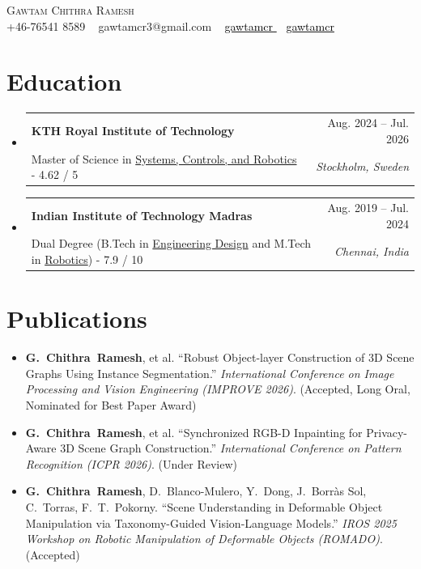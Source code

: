 \documentclass[letterpaper, 11pt]{article}
\makeatletter
\newcommand{\resumeSubheading}[4]{
\vspace{-1pt}
\item
\begin{tabular*}{1.0\textwidth}[t]{l@{\extracolsep{\fill}}r}
	\textbf{#1}       & {\small #2} \\
	{\small#3} & \textit{\small #4} \\
\end{tabular*}
\vspace{-10pt}
}
\newcommand{\resumeSubHeadingListStart}{\begin{itemize}[leftmargin=0.0in, label={}]}
\newcommand{\resumeSubHeadingListEnd}{\end{itemize}}
\makeatother
\begin{document}
	
\begin{center}
    {\Huge \scshape Gawtam Chithra Ramesh} \\
    \vspace{3pt}
    \vspace{1pt}
    \small 
    {
    \raisebox{-0.1\height}{\faPhone} +46-76541 8589 ~
    \href{gawtamcr3@gmail.com}{\raisebox{-0.2\height}{\faEnvelope}} {gawtamcr3@gmail.com} ~
    \href{https://linkedin.com/in/gawtamcr/}{\raisebox{-0.2\height}{\faLinkedin} \textcolor{black}{gawtamcr} } ~
    \href{https://gawtamcr.github.io/}{\raisebox{-0.2\height}{\faGithub} \textcolor{black}{gawtamcr}}
    }
    \vspace{-8pt}
\end{center}

\section{Education}
    \resumeSubHeadingListStart 
    \resumeSubheading {KTH Royal Institute of Technology}{Aug. 2024 -- Jul. 2026}{Master of Science in \href{https://www.kth.se/en/studies/master/systems-control-robotics/msc-systems-control-and-robotics-1.8733}{Systems, Controls, and Robotics} - 4.62 / 5}{Stockholm, Sweden}
    
    \resumeSubheading {Indian Institute of Technology Madras}{Aug. 2019 -- Jul. 2024}{Dual Degree (B.Tech in \href{https://ed.iitm.ac.in/about.html}{Engineering Design} and M.Tech in \href{https://ed.iitm.ac.in/~robotics_lab/}{Robotics}) - 7.9 / 10}{Chennai, India}

    \resumeSubHeadingListEnd

\section{Publications}
\begin{itemize}[leftmargin=0.15in]
    \setlength{\itemsep}{2pt}
    \item \textbf{G.~Chithra~Ramesh}, et al. ``Robust Object-layer Construction of 3D Scene Graphs Using Instance Segmentation.'' \textit{International Conference on Image Processing and Vision Engineering (IMPROVE 2026)}. (Accepted, Long Oral, Nominated for Best Paper Award)
    \item \textbf{G.~Chithra~Ramesh}, et al. ``Synchronized RGB-D Inpainting for Privacy-Aware 3D Scene Graph Construction.'' \textit{International Conference on Pattern Recognition (ICPR 2026)}. (Under Review)
    \item \textbf{G.~Chithra~Ramesh}, D.~Blanco-Mulero, Y.~Dong, J.~Borr\`as Sol, C.~Torras, F.~T.~Pokorny. ``Scene Understanding in Deformable Object Manipulation via Taxonomy-Guided Vision-Language Models.'' \textit{IROS 2025 Workshop on Robotic Manipulation of Deformable Objects (ROMADO)}. (Accepted)
\end{itemize}
\end{document}
